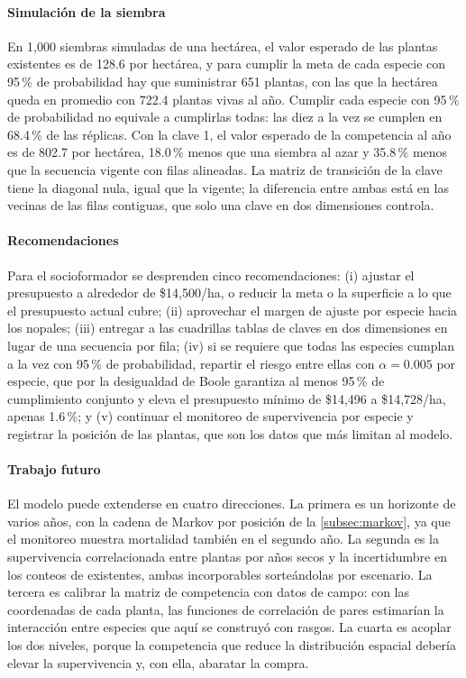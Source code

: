\paragraph{Simulación de la siembra} En 1{,}000 siembras simuladas de una hectárea, el valor esperado de las plantas existentes es de 128.6 por hectárea, y para cumplir la meta de cada especie con 95\,\% de probabilidad hay que suministrar 651 plantas, con las que la hectárea queda en promedio con 722.4 plantas vivas al año. Cumplir cada especie con 95\,\% de probabilidad no equivale a cumplirlas todas: las diez a la vez se cumplen en 68.4\,\% de las réplicas. Con la clave 1, el valor esperado de la competencia al año es de 802.7 por hectárea, 18.0\,\% menos que una siembra al azar y 35.8\,\% menos que la secuencia vigente con filas alineadas. La matriz de transición de la clave tiene la diagonal nula, igual que la vigente; la diferencia entre ambas está en las vecinas de las filas contiguas, que solo una clave en dos dimensiones controla.

\paragraph{Recomendaciones} Para el socioformador se desprenden cinco recomendaciones: (i) ajustar el presupuesto a alrededor de \$14{,}500/ha, o reducir la meta o la superficie a lo que el presupuesto actual cubre; (ii) aprovechar el margen de ajuste por especie hacia los nopales; (iii) entregar a las cuadrillas tablas de claves en dos dimensiones en lugar de una secuencia por fila; (iv) si se requiere que todas las especies cumplan a la vez con 95\,\% de probabilidad, repartir el riesgo entre ellas con $\alpha=0.005$ por especie, que por la desigualdad de Boole garantiza al menos 95\,\% de cumplimiento conjunto y eleva el presupuesto mínimo de \$14{,}496 a \$14{,}728/ha, apenas 1.6\,\%; y (v) continuar el monitoreo de supervivencia por especie y registrar la posición de las plantas, que son los datos que más limitan al modelo.

\paragraph{Trabajo futuro} El modelo puede extenderse en cuatro direcciones. La primera es un horizonte de varios años, con la cadena de Markov por posición de la \cref{subsec:markov}, ya que el monitoreo muestra mortalidad también en el segundo año. La segunda es la supervivencia correlacionada entre plantas por años secos y la incertidumbre en los conteos de existentes, ambas incorporables sorteándolas por escenario. La tercera es calibrar la matriz de competencia con datos de campo: con las coordenadas de cada planta, las funciones de correlación de pares estimarían la interacción entre especies que aquí se construyó con rasgos. La cuarta es acoplar los dos niveles, porque la competencia que reduce la distribución espacial debería elevar la supervivencia y, con ella, abaratar la compra.
